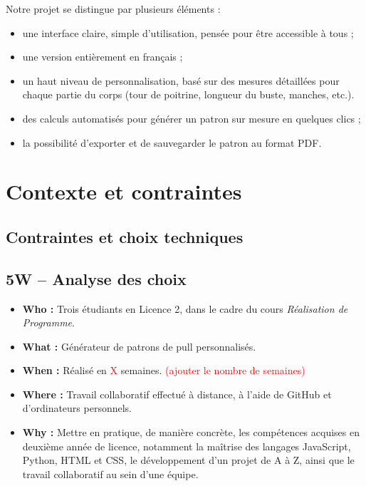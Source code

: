 \documentclass{article}
\begin{document}
	Notre projet se distingue par plusieurs éléments :
	\begin{itemize}
	\item une interface claire, simple d’utilisation, pensée pour être accessible à tous ;
	\item une version entièrement en français ;
	\item un haut niveau de personnalisation, basé sur des mesures détaillées pour chaque partie du corps (tour de poitrine, longueur du buste, manches, etc.).
	\item des calculs automatisés pour générer un patron sur mesure en quelques clics ;
	\item la possibilité d’exporter et de sauvegarder le patron au format PDF.
	\end{itemize}
	
	\section{Contexte et contraintes}
	\subsection{Contraintes et choix techniques}
	

	\subsection*{5W – Analyse des choix}
	\begin{itemize}
		\item \textbf{Who :} Trois étudiants en Licence 2, dans le cadre du cours \textit{Réalisation de Programme}.
		
		\item \textbf{What :} Générateur de patrons de pull personnalisés.
		
		\item \textbf{When :} Réalisé en \textcolor{red}{X} semaines.  \textcolor{red}{(ajouter le nombre de semaines)}
		
		\item \textbf{Where :} Travail collaboratif effectué à distance, à l’aide de GitHub et d’ordinateurs personnels.
		
		\item \textbf{Why :} Mettre en pratique, de manière concrète, les compétences acquises en deuxième année de licence, notamment la maîtrise des langages JavaScript, Python, HTML et CSS, le développement d’un projet de A à Z, ainsi que le travail collaboratif au sein d’une équipe.
	\end{itemize}
\end{document}

